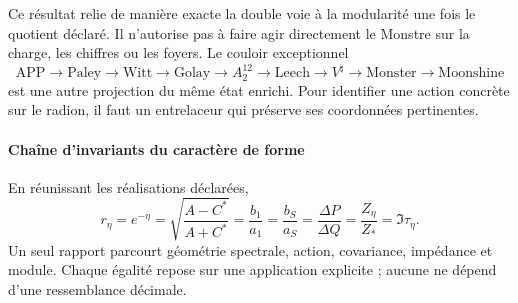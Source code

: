 Ce résultat relie de manière exacte la double voie à la modularité une
fois le quotient déclaré. Il n'autorise pas à faire agir directement le
Monstre sur la charge, les chiffres ou les foyers. Le couloir exceptionnel
\[
\mathrm{APP}\to\mathrm{Paley}\to\mathrm{Witt}\to\mathrm{Golay}
\to A_2^{12}\to\mathrm{Leech}\to V^\natural
\to\mathrm{Monster}\to\mathrm{Moonshine}
\]
est une autre projection du même état enrichi. Pour identifier une action
concrète sur le radion, il faut un entrelaceur qui préserve ses
coordonnées pertinentes.

\paragraph{Chaîne d'invariants du caractère de forme}

En réunissant les réalisations déclarées,
\begin{equation}
\boxed{
r_\eta=e^{-\eta}
=\sqrt{\frac{A-C^*}{A+C^*}}
=\frac{b_1}{a_1}
=\frac{b_S}{a_S}
=\frac{\Delta P}{\Delta Q}
=\frac{Z_\eta}{Z_*}
=\Im\tau_\eta.}
\label{eq:shape-master}
\end{equation}
Un seul rapport parcourt géométrie spectrale, action, covariance, impédance et
module. Chaque égalité repose sur une application explicite ; aucune ne dépend d'une
ressemblance décimale.

